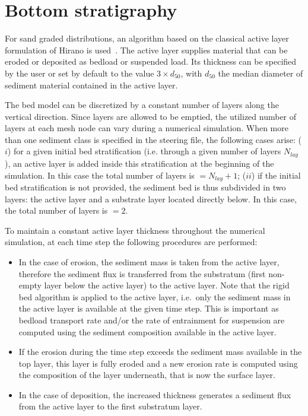 \pagebreak
\section[Bottom stratigraphy]{Bottom stratigraphy}
For sand graded distributions, an algorithm based on the classical active layer formulation of Hirano is used~\cite{doi:10.1029/2006WR005474}. The active layer supplies material that can be eroded or deposited as bedload or suspended load. Its thickness can be specified by the user or set by default to the value $3\times d_{50}$, with $d_{50}$ the median diameter of sediment material contained in the active layer.

The bed model can be discretized by a constant number of layers along the vertical direction. Since layers are allowed to be emptied, the utilized number of layers at each mesh node can vary during a numerical simulation. When more than one sediment class is specified in the steering file, the following cases arise: ($i$) for a given initial bed stratification (i.e. through a given number of layers $N_{lay}$), an active layer is added inside this stratification at the beginning of the simulation. In this case the total number of layers is $=N_{lay}+1$; ($ii$) if the initial bed stratification is not provided, the sediment bed is thus subdivided in two layers: the active layer and a substrate layer located directly below. In this case, the total number of layers is $=2$.

To maintain a constant active layer thickness throughout the numerical simulation, at each time step the following procedures are performed:
\begin{itemize}
    \item In the case of erosion, the sediment mass is taken from the active layer, therefore the sediment flux is transferred from the substratum (first non-empty layer below the active layer) to the active layer. Note that the rigid bed algorithm is applied to the active layer, i.e.~only the sediment mass in the active layer is available at the given time step. This is important as bedload transport rate and/or the rate of entrainment for suspension are computed using the sediment composition available in the active layer.
    \item If the erosion during the time step exceeds the sediment mass available in the top layer, this layer is fully eroded and a new erosion rate is computed using the composition of the layer underneath, that is now the surface layer.
    \item In the case of deposition, the increased thickness generates a sediment flux from the active layer to the first substratum layer. %
\end{itemize}

